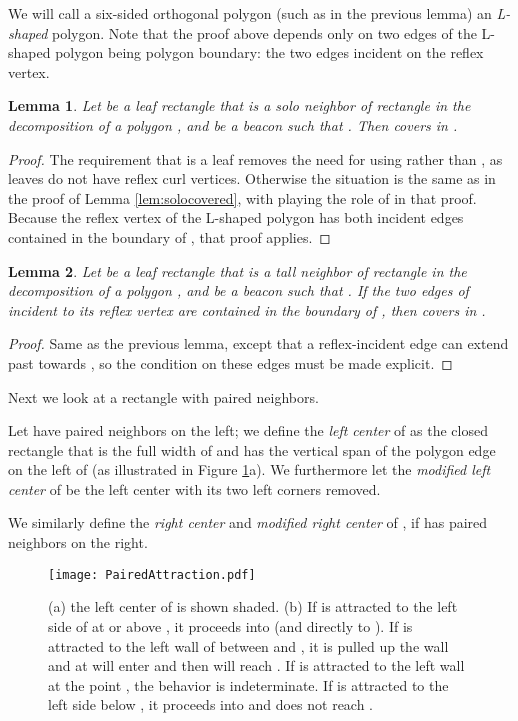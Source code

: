 \documentclass{article}
\newtheorem{lemma}{Lemma}
\begin{document}
		We will call a six-sided orthogonal polygon (such as  in the
		previous lemma) an \emph{L-shaped} polygon.
		Note that the proof above depends only on two edges of the L-shaped polygon
		being polygon boundary: the two edges incident on the reflex vertex.
		
	\begin{lemma}\label{lem:sololeafcovered}
		Let  be a leaf rectangle that is a solo neighbor of rectangle  in the
		decomposition of a polygon , and  be a beacon such that 
		.  Then  covers  in .
	\end{lemma}
	\begin{proof}
	The requirement that  is a leaf removes the need for using  rather than
	, as leaves do not have reflex curl vertices. Otherwise the situation is the
	same as in the proof of Lemma \ref{lem:solocovered}, with 
	playing the role of  in that proof.  Because the reflex vertex of the
	L-shaped polygon  has both incident edges contained
	in the boundary of , that proof applies.
	\end{proof}
	
	
	\begin{lemma}\label{lem:tallleafcovered}
		Let  be a leaf rectangle that is a tall neighbor of rectangle  in the
		decomposition of a polygon , and  be a beacon such that 
		.  If the two edges of  incident to its reflex vertex are contained in the boundary of , then
		 covers  in .
	\end{lemma}
	\begin{proof}
		Same as the previous lemma, except that a reflex-incident edge can extend
		past  towards , so the condition on these edges must be made explicit.
	\end{proof}
	
	Next we look at a rectangle with paired neighbors.
	
	Let  have paired neighbors on the left; we define the 
	\emph{left center} of  as the closed
	rectangle that is the full width of  and has the vertical span of 
	the polygon edge on the left of  (as illustrated in Figure
	\ref{fig:pairedattraction}a).
	We furthermore let the \emph{modified left center} of 
	be the left center with its two left corners removed.
	
	We similarly define the \emph{right center} and \emph{modified right center} of
	, if  has paired neighbors on the right.
	
	\begin{figure}[htbp] 
		\begin{center}
		    \texttt{[image: PairedAttraction.pdf]} 
		\end{center}
		\caption{
			(a) the left center of  is shown shaded.
			(b) If  is attracted to the left side of  at or above , it
			    proceeds into  (and directly to ). If  is attracted to the
			    left wall of  between  and , it is pulled up the wall and at
			     will enter  and then will reach .
				If  is attracted to the left wall at the point , the behavior is
				indeterminate.
				If  is attracted to the left side below , it proceeds into  and
				does not reach .
		}
		\label{fig:pairedattraction}
	\end{figure}
	
\end{document}
